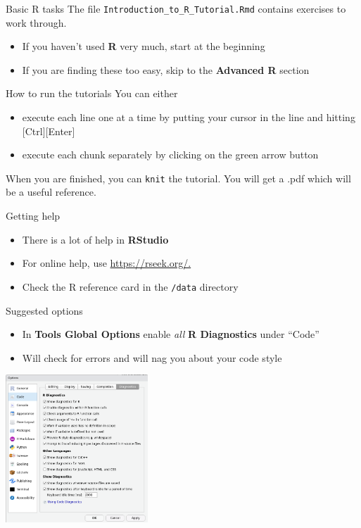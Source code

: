 \documentclass[
  ignorenonframetext,
  aspectratio=169]{beamer}
\providecommand{\tightlist}{%
  \setlength{\itemsep}{0pt}\setlength{\parskip}{0pt}}
\begin{document}
\begin{frame}[fragile]{Basic R tasks}
\protect\hypertarget{basic-r-tasks}{}
The file \texttt{Introduction\_to\_R\_Tutorial.Rmd} contains exercises
to work through.

\begin{itemize}
\tightlist
\item
  If you haven't used \textbf{R} very much, start at the beginning
\item
  If you are finding these too easy, skip to the \textbf{Advanced R}
  section
\end{itemize}
\end{frame}

\begin{frame}[fragile]{How to run the tutorials}
\protect\hypertarget{how-to-run-the-tutorials}{}
You can either

\begin{itemize}
\tightlist
\item
  execute each line one at a time by putting your cursor in the line and
  hitting {[}Ctrl{]}{[}Enter{]}
\item
  execute each chunk separately by clicking on the green arrow button
\end{itemize}

When you are finished, you can \texttt{knit} the tutorial. You will get
a .pdf which will be a useful reference.
\end{frame}

\begin{frame}[fragile]{Getting help}
\protect\hypertarget{getting-help}{}
\begin{itemize}
\tightlist
\item
  There is a lot of help in \textbf{RStudio}
\item
  For online help, use \url{https://rseek.org/.}
\item
  Check the R reference card in the \texttt{/data} directory
\end{itemize}
\end{frame}

\begin{frame}{Suggested options}
\protect\hypertarget{suggested-options}{}
\begin{itemize}
\tightlist
\item
  In \textbf{Tools \textbar{} Global Options} enable \emph{all}
  \textbf{R Diagnostics} under ``Code''
\item
  Will check for errors and will nag you about your code style
\end{itemize}

\includegraphics[width=0.4\textwidth,height=\textheight]{figures/options.png}
\end{frame}
\end{document}
